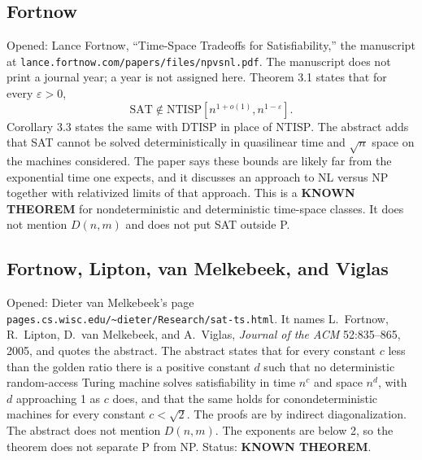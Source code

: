 \documentclass[11pt]{article}
\begin{document}
\subsection*{Fortnow}
Opened: Lance Fortnow, ``Time-Space Tradeoffs for Satisfiability,'' the manuscript at \texttt{lance.fortnow.com/papers/files/npvsnl.pdf}.
The manuscript does not print a journal year; a year is not assigned here.
Theorem 3.1 states that for every \(\varepsilon>0\),
\[
\mathrm{SAT}\notin\mathrm{NTISP}[n^{1+o(1)},n^{1-\varepsilon}].
\]
Corollary 3.3 states the same with \(\mathrm{DTISP}\) in place of \(\mathrm{NTISP}\).
The abstract adds that SAT cannot be solved deterministically in quasilinear time and \(\sqrt{n}\) space on the machines considered.
The paper says these bounds are likely far from the exponential time one expects, and it discusses an approach to NL versus NP together with relativized limits of that approach.
This is a \textbf{KNOWN THEOREM} for nondeterministic and deterministic time-space classes.
It does not mention \(D(n,m)\) and does not put SAT outside P.

\subsection*{Fortnow, Lipton, van Melkebeek, and Viglas}
Opened: Dieter van Melkebeek's page \texttt{pages.cs.wisc.edu/\textasciitilde dieter/Research/sat-ts.html}.
It names L.~Fortnow, R.~Lipton, D.~van Melkebeek, and A.~Viglas, \emph{Journal of the ACM} 52:835--865, 2005, and quotes the abstract.
The abstract states that for every constant \(c\) less than the golden ratio there is a positive constant \(d\) such that no deterministic random-access Turing machine solves satisfiability in time \(n^c\) and space \(n^d\), with \(d\) approaching 1 as \(c\) does, and that the same holds for conondeterministic machines for every constant \(c<\sqrt{2}\).
The proofs are by indirect diagonalization.
The abstract does not mention \(D(n,m)\).
The exponents are below 2, so the theorem does not separate P from NP.
Status: \textbf{KNOWN THEOREM}.
\end{document}
